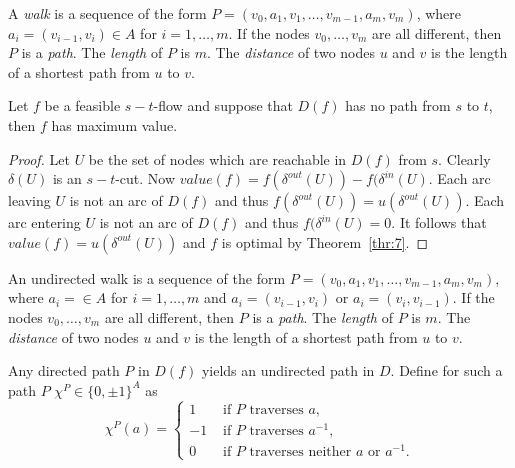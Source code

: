 \begin{definition}
  \label{def:6}
  A \emph{walk} is a sequence of the form
  $P=(v_0,a_1,v_1,\ldots,v_{m-1},a_m,v_m)$, where  $a_i =
  (v_{i-1},v_i)\in A$ for $i=1,\ldots,m$. If the nodes $v_0,\ldots,v_m$ are all
  different, then $P$ is a \emph{path}. The \emph{length } of $P$ is
  $m$. The \emph{distance} of two nodes  $u$ and $v$ is the length of
  a shortest path from $u$ to $v$. 
\end{definition}


\begin{corollary}
  \label{co:6}
  Let $f$ be a feasible $s-t$-flow and suppose that $D(f)$ has no path
  from $s$ to $t$, then $f$ has maximum value.
\end{corollary}


\begin{proof}
  Let $U$ be the set of nodes which are reachable in $D(f)$ from
  $s$. Clearly $\delta(U)$ is an $s-t$-cut. Now $value(f) = f(\delta^{out}(U)) -
  f(\delta^{in}(U)$.  Each arc leaving $U$ is not an arc of $D(f)$ and thus
  $f(\delta^{out}(U)) = u (\delta^{out}(U))$. Each arc entering $U$ is not an
  arc of $D(f)$ and thus $f(\delta^{in}(U) = 0$. It follows that  
  $value(f) = u (\delta^{out}(U))$ and $f$ is optimal by
  Theorem~\ref{thr:7}.  
\end{proof}

\begin{definition}
\label{def:7}
  An undirected walk is a  sequence of the form
  $P=(v_0,a_1,v_1,\ldots,v_{m-1},a_m,v_m)$, where  $a_i =\in A$ for
  $i=1,\ldots,m$ and $a_i = (v_{i-1},v_i)$ or $a_i = (v_{i},v_{i-1})$. If
  the nodes $v_0,\ldots,v_m$ are all 
  different, then $P$ is a \emph{path}. The \emph{length } of $P$ is
  $m$. The \emph{distance} of two nodes  $u$ and $v$ is the length of
  a shortest path from $u$ to $v$. 
\end{definition}


Any directed path $P$ in $D(f)$ yields an undirected path  in
$D$. Define for such a path $P$ $\chi^P \in \{0,\pm1\}^A$ as
\begin{equation}
  \label{eq:29}
  \chi^P(a) = 
  \begin{cases}
    1 & \mbox{ if $P$ traverses $a$},\\
    -1&  \mbox{ if $P$ traverses $a^{-1}$},\\
    0 & \mbox{ if $P$ traverses neither $a$ or $a^{-1}$}. 
  \end{cases}
\end{equation}


